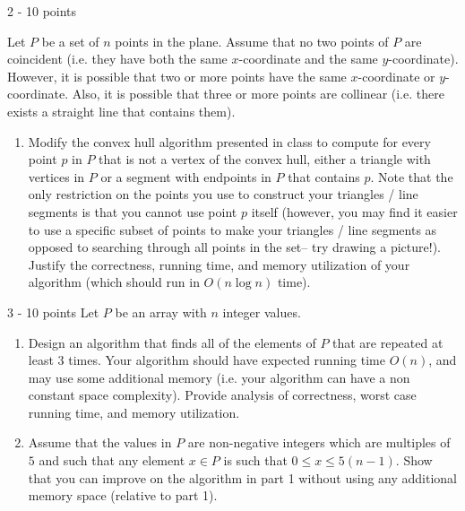 \documentclass{common/cs157}
\begin{document}
\begin{problem}{2 - 10 points}

Let $P$ be a set of $n$ points in the plane. Assume that no two points of $P$ are coincident (i.e. they have both the same $x$-coordinate and the same $y$-coordinate). However, it is possible that two or more points have the same $x$-coordinate or $y$-coordinate. Also, it is possible that three or more points are collinear (i.e. there exists a straight line that contains them).

\begin{enumerate}
    \item Modify the convex hull algorithm presented in class to compute for every point $p$ in $P$ that is not a vertex of the convex hull, either a triangle with vertices in $P$ or a segment with endpoints in $P$ that contains $p$. Note that the only restriction on the points you use to construct your triangles / line segments is that you cannot use point $p$ itself (however, you may find it easier to use a specific subset of points to make your triangles / line segments as opposed to searching through all points in the set-- try drawing a picture!). Justify the correctness, running time, and memory utilization of your algorithm (which should run in $O(n\log n)$ time).
\end{enumerate}
\end{problem}

\newpage

\begin{problem}{3 - 10 points}
Let $P$ be an array with $n$ integer values.
\begin{enumerate}
    \item Design an algorithm that finds all of the elements of $P$ that are repeated at least 3 times. Your algorithm should have expected running time $O(n)$, and may use some additional memory (i.e. your algorithm can have a non constant space complexity). Provide analysis of correctness, worst case running time, and memory utilization.
    \item Assume that the values in $P$ are non-negative integers which are multiples of $5$ and such that any element $x\in P$ is such that $0\leq x\leq 5(n-1)$. Show that you can improve on the algorithm in part 1 without using any additional memory space (relative to part 1).
\end{enumerate}
\end{problem}
\newpage
\end{document}
